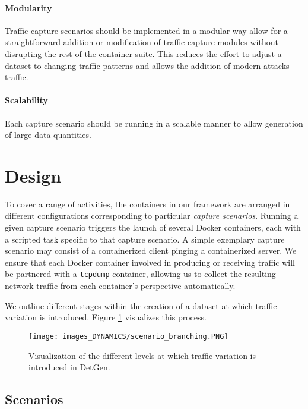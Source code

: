 \paragraph{Modularity} Traffic capture scenarios should be implemented in a modular way allow for a straightforward addition or modification of traffic capture modules without disrupting the rest of the container suite. This reduces the effort to adjust a dataset to changing traffic patterns and allows the addition of modern attacks traffic.

\paragraph{Scalability} Each capture scenario should be running in a scalable manner to allow generation of large data quantities.



\section{Design}\label{Sec:Design}

To cover a range of activities, the containers in our framework are arranged in different configurations corresponding to particular \emph{capture scenarios}. Running a given capture scenario triggers the launch of several Docker containers, each with a scripted task specific to that capture scenario. A simple exemplary capture scenario may consist of a containerized client pinging a containerized server. We ensure that each Docker container involved in producing or receiving traffic will be partnered with a \texttt{tcpdump} container, allowing us to collect the resulting network traffic from each container's perspective automatically. 

We outline different stages within the creation of a dataset at which traffic variation is introduced. Figure \ref{Fig:branching} visualizes this process.


\begin{figure}
 \centering 
 \texttt{[image: images\_DYNAMICS/scenario\_branching.PNG]}
 \caption{Visualization of the different levels at which traffic variation is introduced in DetGen.}
 \label{Fig:branching}
\end{figure}


\subsection{Scenarios}
\label{Sec:Scenarios}

